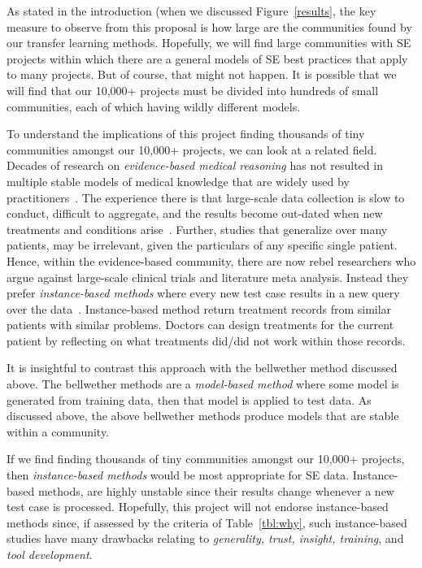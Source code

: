 
As stated in the introduction (when we discussed Figure~\ref{results},
 the key measure to observe from this proposal is  how large are the communities found by our transfer
 learning methods. 
Hopefully, we will find large communities with SE projects within which there are a general
 models of SE best practices that apply to many projects.
 But of course,    that might not happen. It is possible that we will find that our 10,000+ projects
 must be divided into hundreds of small communities, each of which having wildly different models. 
 
 To understand the implications of this project finding thousands of tiny communities amongst our 10,000+ projects,
    we  can look at a related field.
Decades of research on {\em evidence-based medical reasoning}  has not resulted in multiple
stable models of medical knowledge that are widely used by practitioners~\cite{gallego2013role,gallego2015bringing}.  The experience there
is that large-scale data collection is slow to conduct,
difficult to aggregate, and the   results become out-dated  when  new treatments and conditions arise~\cite{gallego2013role}. 
Further, studies that   generalize over many patients,
may be irrelevant, given   the particulars of any specific single patient. 
Hence,   within the evidence-based community,
there are now rebel researchers who argue against large-scale clinical
trials and literature meta analysis. Instead they prefer
{\em instance-based methods} where every new test case results in a new query over the data~\cite{gallego2015bringing}.
Instance-based method return treatment records from  similar patients with similar problems.
Doctors can design treatments for the current patient by reflecting on what treatments
did/did not work within those records.

It is insightful to contrast this approach with the bellwether method discussed above.
The bellwether methods   are a {\em model-based method} where some model
is generated from training data, then that model is applied to test data.
As discussed above, the above bellwether methods produce models that are stable within a community.

If we find finding thousands of tiny communities amongst our 10,000+ projects,
then {\em instance-based methods} would be most appropriate for SE data.
 Instance-based methods, are highly  unstable since their results change whenever a new test case is processed. 
Hopefully, this project will not endorse instance-based methods since, 
if assessed by the criteria of  Table~\ref{tbl:why}, such instance-based  studies have many drawbacks 
relating to {\em generality, trust, insight, training}, and {\em tool development}. 




